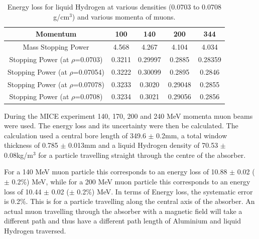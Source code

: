 \begin{table}
  \caption{
    Energy loss for liquid Hydrogen at various densities (0.0703 to 0.0708 g/cm${}^{3}$) and various momenta of muons.
  }
  \label{tab:Hydrogen}
  \begin{center}
    \begin{tabular}{|c c c c c|}
    \hline

Momentum & 100 & 140 & 200 & 344     \rule{0pt}{14pt} \\
\hline
{Mass Stopping Power} & 4.568 & 4.267 & 4.104 & 4.034 \\
{Stopping Power }(at $\rho$=0.0703)\textbf{} & 0.3211 & 0.29997 & 0.2885 & 0.28359\\
{Stopping Power }(at $\rho$=0.07054)\textbf{} & 0.3222 & 0.30099 & 0.2895 & 0.2846 \\
{Stopping Power }(at $\rho$=0.07078)\textbf{} & 0.3233 & 0.3020 & 0.29048 & 0.2855 \\
{Stopping Power }(at $\rho$=0.0708)\textbf{} & 0.3234 & 0.3021 & 0.29056 & 0.2856 \\
    \hline
    \end{tabular}
  \end{center}
\end{table} 


 During the MICE experiment 140, 170, 200 and 240 MeV momenta muon beams were used. The energy loss and its uncertainty were then be calculated. The calculation used a central bore length of 349.6 $\mathrm{\pm}$ 0.2mm, a total window thickness of 0.785 $\mathrm{\pm}$ 0.013mm and a liquid Hydrogen density of 70.53 $\mathrm{\pm}$ 0.08kg/m${}^{3}$ for a particle travelling straight through the centre of the absorber.

 For a 140 MeV muon particle this corresponds to an energy loss of 10.88 $\mathrm{\pm}$ 0.02 ($\mathrm{\pm}$ 0.2\%) MeV, while for a 200 MeV muon particle this corresponds to an energy loss of 10.44 $\mathrm{\pm}$ 0.02 ($\mathrm{\pm}$ 0.2\%) MeV. In terms of Energy loss, the systematic error is 0.2\%. This is for a particle travelling along the central axis of the absorber. An actual muon travelling through the absorber with a magnetic field will take a different path and thus have a different path length of Aluminium and liquid Hydrogen traversed.
 


